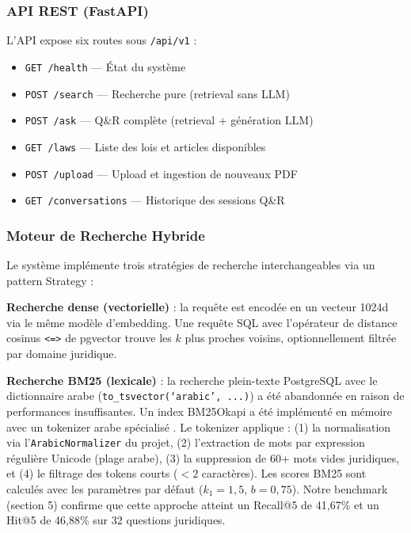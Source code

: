 \subsubsection{API REST (FastAPI)}

L'API \cite{src:api} expose six routes sous \texttt{/api/v1} :

\begin{itemize}
    \item \texttt{GET /health} — État du système
    \item \texttt{POST /search} — Recherche pure (retrieval sans LLM)
    \item \texttt{POST /ask} — Q\&R complète (retrieval + génération LLM)
    \item \texttt{GET /laws} — Liste des lois et articles disponibles
    \item \texttt{POST /upload} — Upload et ingestion de nouveaux PDF
    \item \texttt{GET /conversations} — Historique des sessions Q\&R
\end{itemize}

\subsubsection{Moteur de Recherche Hybride}

Le système implémente trois stratégies de recherche interchangeables via un
pattern Strategy \cite{src:retrieval} :

\textbf{Recherche dense (vectorielle)} : la requête est encodée en un vecteur
1024d via le même modèle d'embedding. Une requête SQL avec l'opérateur de
distance cosinus \texttt{<=>} de pgvector trouve les $k$ plus proches voisins,
optionnellement filtrée par domaine juridique.

\textbf{Recherche BM25 (lexicale)} : la recherche plein-texte PostgreSQL
avec le dictionnaire arabe (\texttt{to\_tsvector(`arabic', ...)}) a été
abandonnée en raison de performances insuffisantes. Un index BM25Okapi a
été implémenté en mémoire avec un tokenizer arabe spécialisé
\cite{src:tokenizer}. Le tokenizer applique : (1) la normalisation via
l'\texttt{ArabicNormalizer} du projet, (2) l'extraction de mots par
expression régulière Unicode (plage arabe), (3) la suppression de 60+ mots
vides juridiques, et (4) le filtrage des tokens courts ($< 2$ caractères).
Les scores BM25 sont calculés avec les paramètres par défaut ($k_1 = 1,5$,
$b = 0,75$). Notre benchmark (section 5) confirme que cette approche atteint
un Recall@5 de 41,67\% et un Hit@5 de 46,88\% sur 32 questions juridiques.

